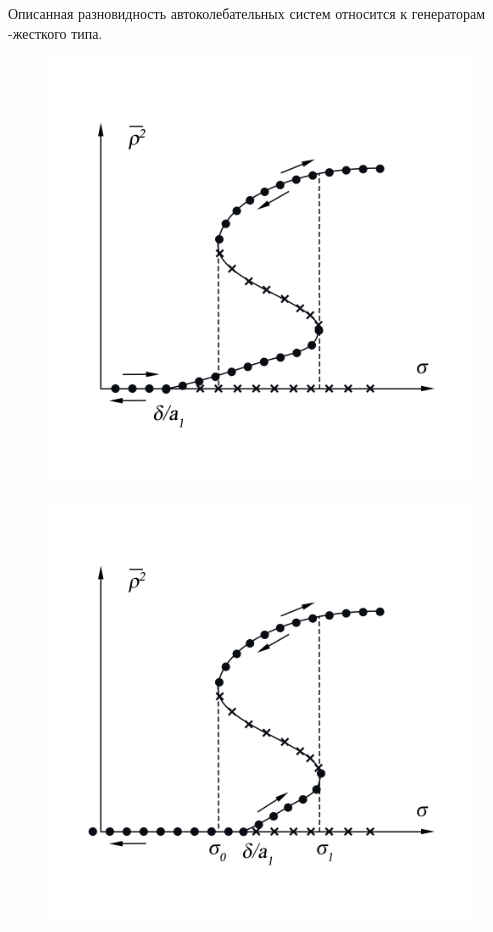 Описанная разновидность автоколебательных систем относится к генераторам {-жесткого типа}.
\begin{center}
    \begin{figure}[H]
        \vspace{-10pt}
        \begin{minipage}{0.49\linewidth}
            \includegraphics[width=\linewidth]{pics/Ris12a.png} 
            \vspace{-50pt}
            \label{fig:10}
        \end{minipage}
    \begin{minipage}{0.49\linewidth}
        \includegraphics[width=\linewidth]{pics/Ris12b.png} 

\end{minipage}
\end{figure}
\end{center}
